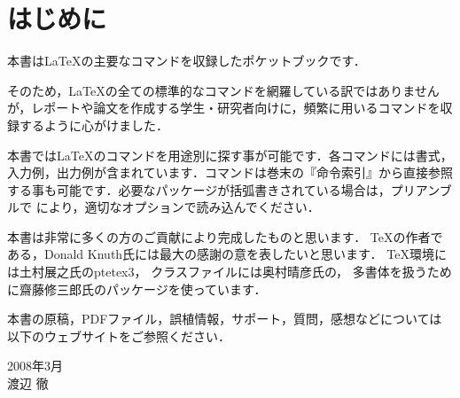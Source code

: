 \chapter{はじめに}

本書は\LaTeX の主要なコマンドを収録したポケットブックです．

そのため，\LaTeX の全ての標準的なコマンドを網羅している訳ではありません
が，レポートや論文を作成する学生・研究者向けに，頻繁に用いるコマンドを収
録するように心がけました．

本書では\LaTeX のコマンドを用途別に探す事が可能です．各コマンドには書式，
入力例，出力例が含まれています．コマンドは巻末の『命令索引』から直接参照
する事も可能です．必要なパッケージが括弧書きされている場合は，プリアンブ
ルで  により，適切なオプションで読み込んでください．


本書は非常に多くの方のご貢献により完成したものと思います．
\TeX の作者である，Donald Knuth氏には最大の感謝の意を表したいと思います．
\TeX 環境には土村展之氏のptetex3，
クラスファイルには奥村晴彦氏の，
多書体を扱うために齋藤修三郎氏のパッケージを使っています．


本書の原稿，PDFファイル，誤植情報，サポート，質問，感想などについては
以下のウェブサイトをご参照ください．
\begin{quote}
 \webMyTeXpert
\end{quote}

\vfill
\begin{flushright}
 2008年3月\\
 渡辺 徹
\end{flushright}

